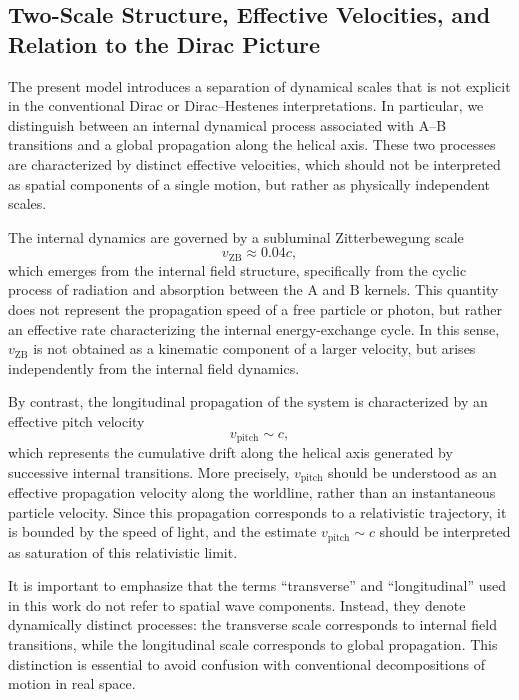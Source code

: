 \documentclass[%
 reprint, amsmath,amssymb, aps, prb, ]{revtex4-2}
\numberwithin{equation}{section}
\begin{document}
\subsection{Two-Scale Structure, Effective Velocities, and Relation to the Dirac Picture}
\label{sec:two_scale_structure}

The present model introduces a separation of dynamical scales that is not explicit in the conventional Dirac or Dirac--Hestenes interpretations. In particular, we distinguish between an internal dynamical process associated with A--B transitions and a global propagation along the helical axis. These two processes are characterized by distinct effective velocities, which should not be interpreted as spatial components of a single motion, but rather as physically independent scales.

The internal dynamics are governed by a subluminal Zitterbewegung scale
\begin{equation}
v_{\mathrm{ZB}} \approx 0.04c,
\end{equation}
which emerges from the internal field structure, specifically from the cyclic process of radiation and absorption between the A and B kernels. This quantity does not represent the propagation speed of a free particle or photon, but rather an effective rate characterizing the internal energy-exchange cycle. In this sense, $v_{\mathrm{ZB}}$ is not obtained as a kinematic component of a larger velocity, but arises independently from the internal field dynamics.

By contrast, the longitudinal propagation of the system is characterized by an effective pitch velocity
\begin{equation}
v_{\mathrm{pitch}} \sim c,
\end{equation}
which represents the cumulative drift along the helical axis generated by successive internal transitions. More precisely, $v_{\mathrm{pitch}}$ should be understood as an effective propagation velocity along the worldline, rather than an instantaneous particle velocity. Since this propagation corresponds to a relativistic trajectory, it is bounded by the speed of light, and the estimate $v_{\mathrm{pitch}} \sim c$ should be interpreted as saturation of this relativistic limit.

It is important to emphasize that the terms ``transverse'' and ``longitudinal'' used in this work do not refer to spatial wave components. Instead, they denote dynamically distinct processes: the transverse scale corresponds to internal field transitions, while the longitudinal scale corresponds to global propagation. This distinction is essential to avoid confusion with conventional decompositions of motion in real space.
\end{document}
